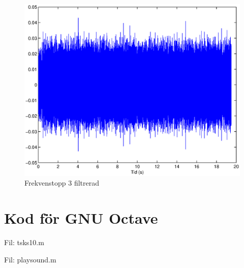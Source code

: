 \documentclass[10pt]{article}
\begin{document}
\begin{figure}[htp]
  \begin{center}
  \includegraphics[keepaspectratio=true,width=\linewidth]{topp3_filter.eps}  %
  \end{center}
  \caption{Frekvenstopp 3 filtrerad} %
  \label{fig:topp3_filter}
\end{figure}

\newpage
\section{Kod för GNU Octave}

Fil: tsks10.m



\newpage

Fil: playsound.m


\end{document}
